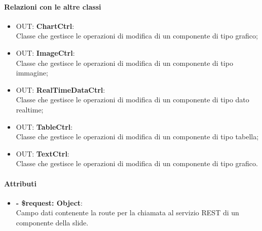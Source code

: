 	\paragraph{Relazioni con le altre classi}
	\begin{itemize}
		\item OUT: \textbf{ChartCtrl}:\\
			Classe che gestisce le operazioni di modifica di un componente di tipo grafico;
		\item OUT: \textbf{ImageCtrl}:\\
			Classe che gestisce le operazioni di modifica di un componente di tipo immagine;
		\item OUT: \textbf{RealTimeDataCtrl}:\\
			Classe che gestisce le operazioni di modifica di un componente di tipo dato realtime;
		\item OUT: \textbf{TableCtrl}:\\
			Classe che gestisce le operazioni di modifica di un componente di tipo tabella;
		\item OUT: \textbf{TextCtrl}:\\
			Classe che gestisce le operazioni di modifica di un componente di tipo grafico.
	\end{itemize}
	
	\paragraph{Attributi}
	\begin{itemize}
		\item \textbf{- \$request: Object}:\\
		Campo dati contenente la route per la chiamata al servizio \gls{REST} di un componente della slide.
	\end{itemize}	
	
